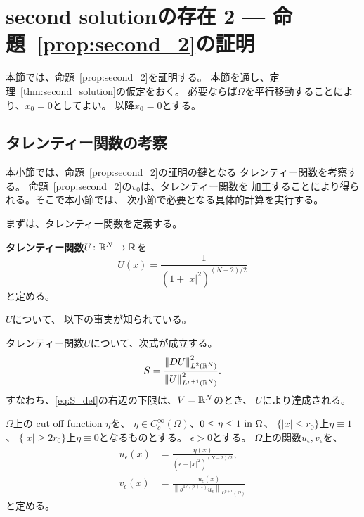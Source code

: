 \section{second solutionの存在 2 --- 命題~\ref{prop:second_2}の証明} \label{sec:second_sol2}

本節では、命題~\ref{prop:second_2}を証明する。
本節を通し、定理~\ref{thm:second_solution}の仮定をおく。
必要ならば$\Omega$を平行移動することにより、$x_0 = 0$としてよい。
以降$x_0 = 0$とする。

\subsection{タレンティー関数の考察}

本小節では、命題~\ref{prop:second_2}の証明の鍵となる
タレンティー関数を考察する。
命題~\ref{prop:second_2}の$v_0$は、タレンティー関数を
加工することにより得られる。そこで本小節では、
次小節で必要となる具体的計算を実行する。

まずは、タレンティー関数を定義する。
\begin{defn}
 {\bf タレンティー関数}$U \colon \mathbb{R}^N \to \mathbb{R}$を
 \[
   U(x) = \frac{1}{(1 + \lvert x \rvert^2)^{(N-2)/2}}
 \]
 と定める。
\end{defn}

$U$について、
以下の事実が知られている。

\begin{lem}[\cite{MR0463908}]
 タレンティー関数$U$について、次式が成立する。
 \begin{equation}
  S = \frac{\left\| DU \right\|_{L^2(\mathbb{R}^N)}^2}
   {\left\| U \right\|_{L^{p+1}(\mathbb{R}^N)}^2}. 
   \label{eq:S_ach}
 \end{equation}
 すなわち、\eqref{eq:S_def}の右辺の下限は、$V = \mathbb{R}^N$のとき、
 $U$により達成される。
\end{lem}

\begin{nota}
$\Omega$上の cut off function $\eta$を、
$\eta \in C^\infty_c (\Omega)$、$0 \leq \eta \leq 1 ~\text{in}~
\Omega$、
$\{ \lvert x \rvert \leq r_0 \}$上$\eta \equiv 1$、
$\{ \lvert x \rvert \geq 2r_0 \}$上$\eta \equiv 0$となるものとする。
$\epsilon > 0$とする。
$\Omega$上の関数$u_\epsilon, v_\epsilon$を、
\begin{align}
 u_\epsilon (x) &= \frac{\eta(x)}{(\epsilon + \lvert x
 \rvert^2)^{(N-2)/2}}, \label{eq:def_uepsilon} \\
 v_\epsilon (x) &= \frac{u_\epsilon(x)}{\left\| b^{1/(p+1)} u_\epsilon \right\|_{L^{p+1}(\Omega)}} \label{eq:def_vepsilon}
\end{align}
と定める。
\end{nota}

